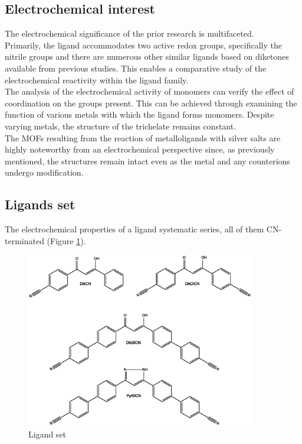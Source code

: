 \documentclass[../Master.tex]{subfiles}
\begin{document}
\subsection{Electrochemical interest}

The electrochemical significance of the prior research is multifaceted.\\
Primarily, the ligand accommodates two active redox groups, specifically the nitrile groups and there are numerous other similar ligands based on diketones available from previous studies. This enables a comparative study of the electrochemical reactivity within the ligand family.\\
The analysis of the electrochemical activity of monomers can verify the effect of coordination on the groups present. This can be achieved through examining the function of various metals with which the ligand forms monomers. Despite varying metals, the structure of the trichelate remains constant.\\
The MOFs resulting from the reaction of metalloligands with silver salts are highly noteworthy from an electrochemical perspective since, as previously mentioned, the structures  remain intact even as the metal and any counterions undergo modification.

\subsection{Ligands set}

The electrochemical properties of a ligand systematic series, all of them CN-terminated (Figure \ref{fig:lig-set}). \\

\begin{figure}[h!]
	\centering
	\includegraphics[width=10cm,keepaspectratio]{Structures/mussini/leganti.eps}
	\caption{Ligand set}
	\label{fig:lig-set}
\end{figure}
\end{document}
